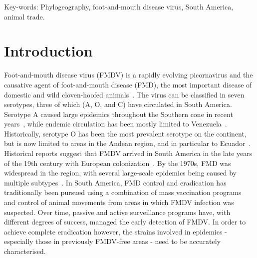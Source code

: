 \documentclass[10pt]{article}
\begin{document}
Key-words: Phylogeography, foot-and-mouth disease virus, South America, animal trade.

\section*{Introduction}


Foot-and-mouth disease virus (FMDV) is a rapidly evolving picornavirus and the causative agent of foot-and-mouth disease (FMD), the most important disease of domestic and wild cloven-hoofed animals~\citep{Grubman2004}.
The virus can be classified in seven serotypes, three of which (A, O, and C) have circulated in South America.
Serotype A caused large epidemics throughout the Southern cone in recent years~\citep{Perez2001, Malirat2012}, while endemic circulation has been mostly limited to Venezuela~\citep{Malirat2012}.
Historically, serotype O has been the most prevalent serotype on the continent, but is now limited to areas in the Andean region, and in particular to Ecuador~\citep{Malirat2011a}.
Historical reports suggest that FMDV arrived in South America in the late years of the 19th century with European colonization~\citep{Naranjo2013, Tully2008}. 
By the 1970s, FMD was widespread in the region, with several large-scale epidemics being caused by multiple subtypes~\citep{Saraiva2003}.
In South America, FMD control and eradication has traditionally been pursued using a combination of mass vaccination programs~\citep{Saraiva2004b} and control of animal movements from areas in which FMDV infection was suspected.
Over time, passive and active surveillance programs have, with different degrees of success, managed the early detection of FMDV.
In order to achieve complete eradication however, the strains involved in epidemics - especially those in previously FMDV-free areas - need to be accurately characterised.
\end{document}

